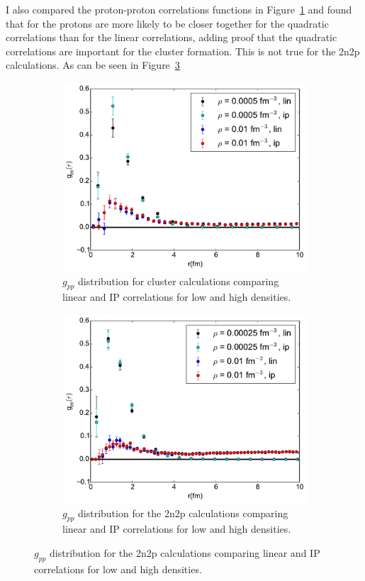 \documentclass[12pt]{article}
\begin{document}
I also compared the proton-proton correlations functions in Figure~\ref{fig:gpp_linVSip} and found that for the protons are more likely to be closer together for the quadratic correlations than for the linear correlations, adding proof that the quadratic correlations are important for the cluster formation. This is not true for the 2n2p calculations. As can be seen in Figure~\ref{fig:gpp_linVSip_alpha}
\begin{figure}[h!]
   \centering
   \begin{subfigure}{0.49\textwidth}
      \includegraphics[width=\textwidth]{../../gpp_linVSip.pdf}
      \caption{$g_{pp}$ distribution for cluster calculations comparing linear and IP correlations for low and high densities.}
      \label{fig:gpp_linVSip}
   \end{subfigure}
   \begin{subfigure}{0.49\textwidth}
      \includegraphics[width=\textwidth]{../../gpp_linVSip_alpha.pdf}
      \caption{$g_{pp}$ distribution for the 2n2p calculations comparing linear and IP correlations for low and high densities.}
      \label{fig:gpp_linVSip_alpha}
   \end{subfigure}
\end{figure}
\end{document}
